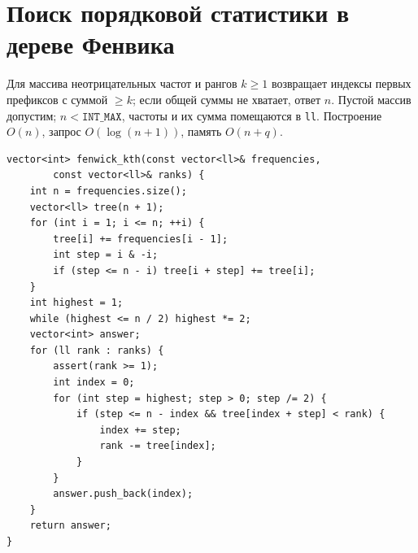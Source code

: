 \section{Поиск порядковой статистики в дереве Фенвика}
Для массива неотрицательных частот и рангов $k\ge1$ возвращает индексы первых префиксов с суммой $\ge k$; если общей суммы не хватает, ответ $n$.
Пустой массив допустим; $n<\texttt{INT\_MAX}$, частоты и их сумма помещаются в \texttt{ll}.
Построение $O(n)$, запрос $O(\log(n+1))$, память $O(n+q)$.
\begin{lstlisting}[name=fenwick_kth]
vector<int> fenwick_kth(const vector<ll>& frequencies,
        const vector<ll>& ranks) {
    int n = frequencies.size();
    vector<ll> tree(n + 1);
    for (int i = 1; i <= n; ++i) {
        tree[i] += frequencies[i - 1];
        int step = i & -i;
        if (step <= n - i) tree[i + step] += tree[i];
    }
    int highest = 1;
    while (highest <= n / 2) highest *= 2;
    vector<int> answer;
    for (ll rank : ranks) {
        assert(rank >= 1);
        int index = 0;
        for (int step = highest; step > 0; step /= 2) {
            if (step <= n - index && tree[index + step] < rank) {
                index += step;
                rank -= tree[index];
            }
        }
        answer.push_back(index);
    }
    return answer;
}
\end{lstlisting}
%

